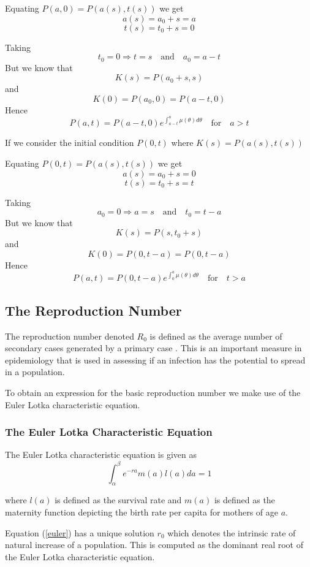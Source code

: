 Equating $P(a,0)= P(a(s),t(s))$  we get 
\[a(s)=a_0 + s= a\]
\[t(s)=t_0 +s =0\]

Taking \[t_0=0\Longrightarrow t=s \quad \text{and} \quad a_0=a-t\]
But we know that \[K(s)=P(a_0+s,s)\] and \[K(0)=P(a_0,0)=P(a-t,0)\]
Hence \begin{equation}
P(a,t)=P(a-t,0)e^{\int^{a}_{a-t} \mu (\theta) d \theta} \quad \text{for} \quad a >t
\end{equation}

If we consider the initial condition $P(0,t)$
where $K(s)= P(a(s),t(s))$

Equating $P(0,t)= P(a(s),t(s))$  we get 
\[a(s)=a_0 + s= 0\]
\[t(s)=t_0 +s =t\]

Taking \[a_0=0\Longrightarrow a=s \quad \text{and} \quad t_0=t-a\]
But we know that \[K(s)=P(s,t_0 + s)\] and \[K(0)=P(0,t-a)=P(0,t-a)\]
Hence \begin{equation}
P(a,t)=P(0,t-a)e^{\int^{a}_{0} \mu (\theta) d \theta} \quad \text{for} \quad t >a
\end{equation}
 \subsection{The Reproduction Number}
 The reproduction number denoted $R_0$ is defined as the average number of secondary cases generated by a primary case \cite{Chowell155}. This is an important measure in epidemiology that is used in assessing if an infection has the potential to spread in a population.
 
To obtain an expression for the basic reproduction number we make use of the Euler Lotka characteristic equation.
 
\subsubsection{The Euler Lotka Characteristic Equation}
 The Euler Lotka characteristic equation is given as 
 \begin{equation}\label{euler}
 \int_{\alpha}^{\beta} e^{-ra} m(a) l(a) da =1
 \end{equation}

where $l(a)$ is defined as the survival rate and $m(a)$ is defined as the maternity function depicting the birth rate per capita for mothers of age $a$.

Equation (\ref{euler}) has a unique solution $r_0$ which denotes the intrinsic rate of natural increase of a population. This is computed as the dominant real root of the Euler Lotka characteristic equation.

